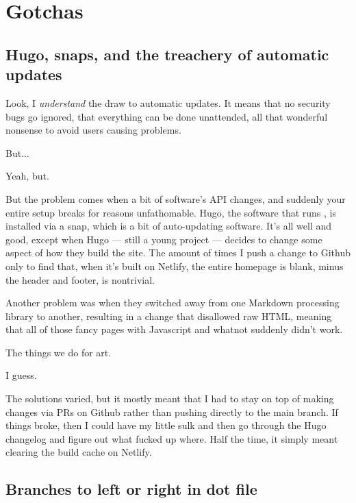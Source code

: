 \chapter*{Gotchas}

\begin{paracol}{2}
\begin{leftcolumn}

\label{gotchas}

\section*{Hugo, snaps, and the treachery of automatic updates}\label{hugoversions}

Look, I \emph{understand} the draw to automatic updates. It means that no security bugs go ignored, that everything can be done unattended, all that wonderful nonsense to avoid users causing problems.

\begin{ally}
  But...
\end{ally}
Yeah, but.

But the problem comes when a bit of software's API changes, and suddenly your entire setup breaks for reasons unfathomable. Hugo, the software that runs \allyId, is installed via a snap, which is a bit of auto-updating software. It's all well and good, except when Hugo --- still a young project --- decides to change some aspect of how they build the site. The amount of times I push a change to Github only to find that, when it's built on Netlify, the entire homepage is blank, minus the header and footer, is nontrivial.

Another problem was when they switched away from one Markdown processing library to another, resulting in a change that disallowed raw HTML, meaning that all of those fancy pages with Javascript and whatnot suddenly didn't work.

\begin{ally}
  The things we do for art.
\end{ally}
I guess.

The solutions varied, but it mostly meant that I had to stay on top of making changes via PRs on Github rather than pushing directly to the main branch. If things broke, then I could have my little sulk and then go through the Hugo changelog and figure out what fucked up where. Half the time, it simply meant clearing the build cache on Netlify.

\section*{Branches to left or right in dot file}\label{branchdir}


\end{leftcolumn}
\end{paracol}
